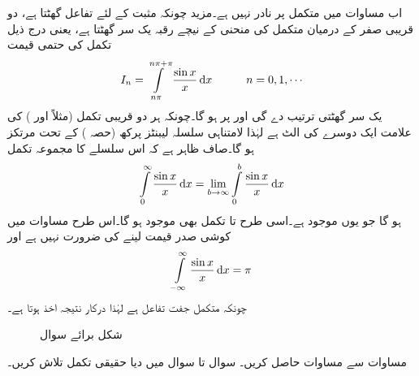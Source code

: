 اب مساوات  میں متکمل  پر نادر  نہیں ہے۔مزید چونکہ مثبت  کے لئے تفاعل  گھٹتا ہے، دو قریبی صفر کے درمیان متکمل کی منحنی کے نیچے رقبہ یک سر گھٹتا ہے، یعنی درج ذیل تکمل کی حتمی قیمت 
\begin{align*}
I_n=\int\limits_{n\pi}^{n\pi+\pi}\frac{\sin x}{x}\dif x\quad\quad \quad n=0,1,\cdots
\end{align*} 
یک سر گھٹتی ترتیب   دے گی اور  پر  ہو گا۔چونکہ ہر دو قریبی تکمل (مثلاً  اور ) کی علامت ایک دوسرے کی الٹ ہے  لہٰذا لامتناہی سلسلہ  لیبنٹز پرکھ (حصہ ) کے تحت مرتکز ہو گا۔صاف ظاہر ہے کہ اس سلسلے کا مجموعہ تکمل
\begin{align*}
\int\limits_0^{\infty} \frac{\sin x}{x}\dif x=\lim_{b\to \infty} \int\limits_{0}^{b}\frac{\sin x}{x}\dif x
\end{align*}
ہو گا جو یوں موجود ہے۔اسی طرح  تا  تکمل بھی موجود ہو گا۔اس طرح  مساوات  میں کوشی صدر قیمت لینے کی ضرورت نہیں ہے اور
\begin{align*}
\int\limits_{-\infty}^{\infty} \frac{\sin x}{x}\dif x=\pi
\end{align*}
چونکہ متکمل  جفت تفاعل ہے لہٰذا درکار نتیجہ اخذ ہوتا ہے۔
\begin{figure}
\centering
{}
\caption{شکل برائے سوال }
\label{شکل_سوال_بقیہ_کوشی_صدر_قیمت_دو_قطب}
\end{figure}
\quad
مساوات  سے مساوات  حاصل کریں۔
سوال  تا سوال  میں دیا حقیقی تکمل تلاش کریں۔

